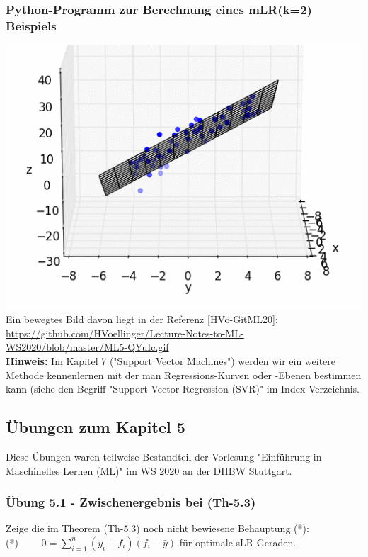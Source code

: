 \documentclass[12pt]{article}
\begin{document}
\subsubsection{Python-Programm zur Berechnung eines mLR(k=2) Beispiels}

\includegraphics{ML5-MovingPicture_mLR}\\
%
Ein bewegtes Bild davon liegt in der Referenz [HVö-GitML20]: 
{\url{https://github.com/HVoellinger/Lecture-Notes-to-ML-WS2020/blob/master/ML5-QYuIc.gif}}\\[0.2cm]
%
\textbf{Hinweis:} Im Kapitel 7 ("Support Vector Machines") werden wir ein weitere Methode kennenlernen mit der man Regressions-Kurven oder -Ebenen  bestimmen kann (siehe den Begriff "Support Vector Regression (SVR)" im Index-Verzeichnis. 

\subsection{Übungen zum Kapitel 5}
 
Diese Übungen waren teilweise Bestandteil der Vorlesung "Einführung in Maschinelles  Lernen (ML)" im WS 2020 an der DHBW Stuttgart.

\subsubsection{Übung 5.1 - Zwischenergebnis bei (Th-5.3)}

Zeige die im Theorem (Th-5.3) noch nicht bewiesene Behauptung (*):\\ [0.2cm]
(*) $ \qquad 0 = \sum_{i=1}^{n} (y_i - f_i)(f_i - \bar{y})$ für optimale sLR Geraden. 
\end{document}
